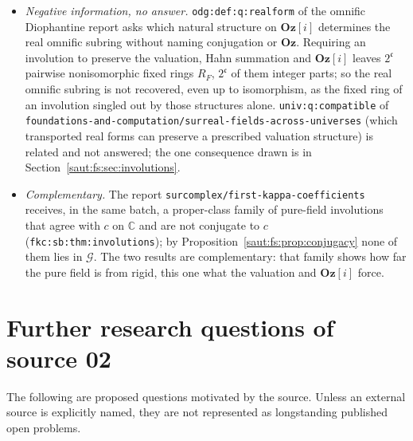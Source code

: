 \documentclass[11pt]{article}
\theoremstyle{definition}
\theoremstyle{remark}
\newcommand{\C}{\mathbb C}
\newcommand{\repo}[1]{\nolinkurl{#1}}%
\newcommand{\lbl}[1]{\nolinkurl{#1}}%
\newcommand{\Oz}{\mathbf{Oz}}
\newcommand{\cc}{\mathfrak c}
\numberwithin{equation}{section}
\begin{document}
\begin{itemize}
Theorem~\ref{saut:fs:thm:large-family} gives $2^{\cc}$ members of $\mathcal G$ that are
pairwise nonconjugate under every field automorphism, in particular under every
$\Oz[i]$-preserving one; its copies are not addressed.
\item \emph{Negative information, no answer.} \lbl{odg:def:q:realform} of the omnific
Diophantine report asks which natural structure on $\Oz[i]$ determines the real
omnific subring without naming conjugation or $\Oz$. Requiring an involution to
preserve the valuation, Hahn summation and $\Oz[i]$ leaves $2^{\cc}$ pairwise
nonisomorphic fixed rings $R_F$, $2^{\cc}$ of them integer parts; so the real omnific
subring is not recovered, even up to isomorphism, as the fixed ring of an involution
singled out by those structures alone. \lbl{univ:q:compatible} of
\repo{foundations-and-computation/surreal-fields-across-universes} (which transported
real forms can preserve a prescribed valuation structure) is related and not
answered; the one consequence drawn is in Section~\ref{saut:fs:sec:involutions}.
\item \emph{Complementary.} The report \repo{surcomplex/first-kappa-coefficients}
receives, in the same batch, a proper-class family of pure-field involutions that agree
with $c$ on $\C$ and are not conjugate to $c$ (\lbl{fkc:sb:thm:involutions}); by
Proposition~\ref{saut:fs:prop:conjugacy} none of them lies in $\mathcal G$. The two
results are complementary: that family shows how far the pure field is from rigid,
this one what the valuation and $\Oz[i]$ force.
\end{itemize}

\section{Further research questions of source 02}\label{saut:fs:sec:questions}

The following are proposed questions motivated by the source. Unless an external
source is explicitly named, they are not represented as longstanding published open
problems.
\end{document}
